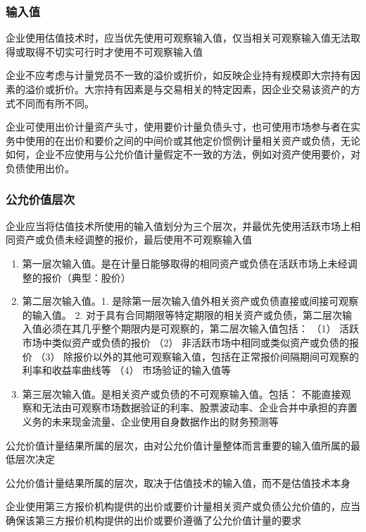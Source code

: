 \documentclass[UTF8,12pt]{ctexart}
\numberwithin{equation}{section} %
\numberwithin{figure}{section}
\numberwithin{table}{section}
\begin{document}
	
	\subsubsection{输入值}
	企业使用估值技术时，应当优先使用可观察输入值，仅当相关可观察输入值无法取得或取得不切实可行时才使用不可观察输入值
	
	企业不应考虑与计量党员不一致的溢价或折价，如反映企业持有规模即大宗持有因素的溢价或折价。大宗持有因素是与交易相关的特定因素，因企业交易该资产的方式不同而有所不同。
	
	企业可使用出价计量资产头寸，使用要价计量负债头寸，也可使用市场参与者在实务中使用的在出价和要价之间的中间价或其他定价惯例计量相关资产或负债，无论如何，企业不应使用与公允价值计量假定不一致的方法，例如对资产使用要价，对负债使用出价。
	
	\subsubsection{公允价值层次}
	企业应当将估值技术所使用的输入值划分为三个层次，并最优先使用活跃市场上相同资产或负债未经调整的报价，最后使用不可观察输入值
	
	\begin{enumerate}
		\item 第一层次输入值。是在计量日能够取得的相同资产或负债在活跃市场上未经调整的报价（典型：股价）
		
		\item 第二层次输入值。1.	是除第一层次输入值外相关资产或负债直接或间接可观察的输入值。
		2.	对于具有合同期限等特定期限的相关资产或负债，第二层次输入值必须在其几乎整个期限内是可观察的，第二层次输入值包括：
		（1）	活跃市场中类似资产或负债的报价
		（2）	非活跃市场中相同或类似资产或负债的报价
		（3）	除报价以外的其他可观察输入值，包括在正常报价间隔期间可观察的利率和收益率曲线等
		（4）	市场验证的输入值等
		
		\item 第三层次输入值。是相关资产或负债的不可观察输入值。包括：
		不能直接观察和无法由可观察市场数据验证的利率、股票波动率、企业合并中承担的弃置义务的未来现金流量、企业使用自身数据作出的财务预测等
		
	\end{enumerate}
	
	公允价值计量结果所属的层次，由对公允价值计量整体而言重要的输入值所属的最低层次决定
	
	公允价值计量结果所属的层次，取决于估值技术的输入值，而不是估值技术本身
	
	企业使用第三方报价机构提供的出价或要价计量相关资产或负债公允价值的，应当确保该第三方报价机构提供的出价或要价遵循了公允价值计量的要求
	
\end{document}

